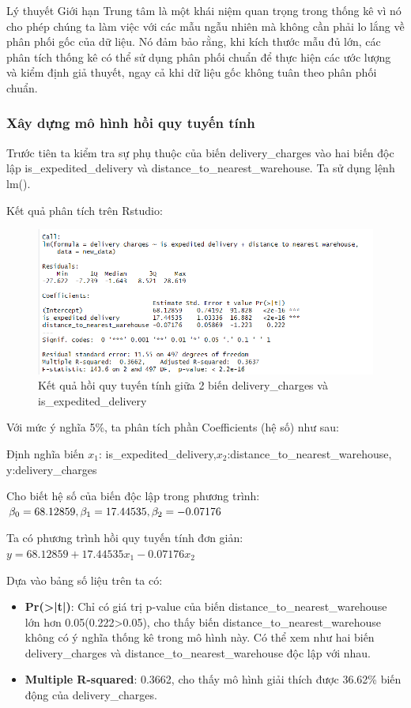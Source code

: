 Lý thuyết Giới hạn Trung tâm là một khái niệm quan trọng trong thống kê vì nó cho phép chúng ta làm việc với các mẫu ngẫu nhiên mà không cần phải lo lắng về phân phối gốc của dữ liệu. Nó đảm bảo rằng, khi kích thước mẫu đủ lớn, các phân tích thống kê có thể sử dụng phân phối chuẩn để thực hiện các ước lượng và kiểm định giả thuyết, ngay cả khi dữ liệu gốc không tuân theo phân phối chuẩn.
\subsubsection{Xây dựng mô hình hồi quy tuyến tính}
Trước tiên ta kiểm tra sự phụ thuộc của biến delivery\_charges vào hai biến độc lập is\_expedited\_delivery và distance\_to\_nearest\_warehouse. Ta sử dụng lệnh lm().

Kết quả phân tích trên Rstudio:
\begin{figure}[!htp]
  \centering
  \includegraphics[width=0.7\linewidth]{graphics/5.5.1.png}
  \caption{Kết quả hồi quy tuyến tính giữa 2 biến delivery\_charges và is\_expedited\_delivery  }
\end{figure}


Với mức ý nghĩa 5\%, ta phân tích phần Coefficients (hệ số) như sau:

Định nghĩa biến $x_1$: is\_expedited\_delivery,$x_2$:distance\_to\_nearest\_warehouse, y:delivery\_charges

Cho biết hệ số của biến độc lập trong phương trình: $\beta_0= 68.12859, \beta_1= 17.44535,\\ \beta_2= -0.07176 $
 
Ta có phương trình hồi quy tuyến tính đơn giản: $y= 68.12859 + 17.44535x_1 - 0.07176x_2$

 Dựa vào bảng số liệu trên ta có:\\
 \begin{itemize}
 \item\textbf{Pr(>|t|)}: Chỉ có giá trị p-value của biến distance\_to\_nearest\_warehouse lớn hơn 0.05(0.222>0.05), cho thấy biến distance\_to\_nearest\_warehouse không có ý nghĩa thống kê trong mô hình này. Có thể xem như hai biến delivery\_charges và distance\_to\_nearest\_warehouse độc lập với nhau.
\item\textbf{Multiple R-squared}: 0.3662, cho thấy mô hình giải thích được 36.62\% biến động của delivery\_charges.
 \end{itemize}

